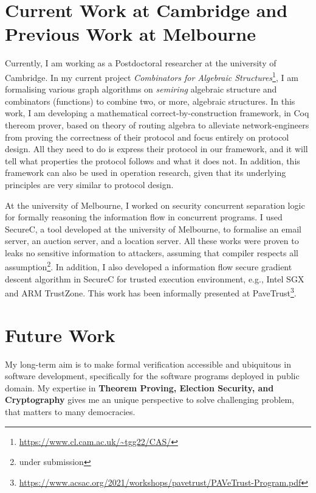 \documentclass[a4paper]{article}
\begin{document}
\section{Current Work at Cambridge and Previous Work at Melbourne}
Currently, I am working as a Postdoctoral researcher at the university of Cambridge. 
In my current project \emph{Combinators for Algebraic Structures}\footnote{\url{https://www.cl.cam.ac.uk/~tgg22/CAS/}}, 
I am formalising various graph algorithms on \emph{semiring} algebraic 
structure and combinators (functions) to 
combine two, or more, algebraic structures. In this work, I am developing 
a mathematical correct-by-construction \cite{10.1007/978-3-319-66107-0_26} 
framework, in Coq thereom prover, based on theory of routing algebra 
\cite{10.1093/imamat/15.2.161, 10.1145/1080091.1080094} to alleviate network-engineers from 
proving the correctness of their protocol and focus entirely on protocol design.
All they need to do is express their protocol in our
framework, and it will tell what properties the protocol follows and what it does not. 
In addition, this framework can also be used in operation
research, given that its underlying principles are very similar to protocol design.



At the university of Melbourne, I worked on 
security concurrent separation logic for formally reasoning the information flow in concurrent programs. 
I used SecureC, a tool developed at the university of Melbourne, to formalise an email server, 
an auction server, and a location server. All these works were proven to leaks no sensitive 
information to attackers, assuming that compiler respects all assumption\footnote{under submission}. 
In addition, I also developed a information flow secure gradient descent algorithm in SecureC for 
trusted execution environment, e.g., Intel SGX and ARM TrustZone. This work has been 
informally presented at PaveTrust\footnote{\url{https://www.acsac.org/2021/workshops/pavetrust/PAVeTrust-Program.pdf}}.


\section{Future Work}
My long-term aim is to make formal verification accessible and ubiquitous in 
software development, specifically for the software programs deployed in public domain. 
My expertise in \textbf{Theorem Proving, Election Security, and Cryptography}
gives me an unique perspective to solve challenging problem, that matters to many democracies. 
\end{document}
